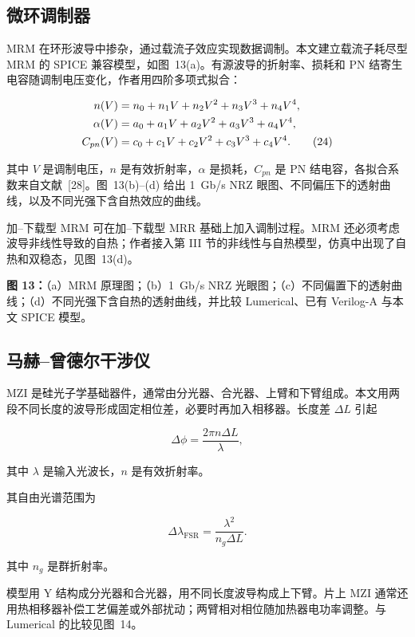 \documentclass[11pt,a4paper]{ctexart}
\begin{document}
\subsection{微环调制器}

MRM 在环形波导中掺杂，通过载流子效应实现数据调制。本文建立载流子耗尽型 MRM 的 SPICE 兼容模型，如图~13(a)。有源波导的折射率、损耗和 PN 结寄生电容随调制电压变化，作者用四阶多项式拟合：

\begin{align}
n(V)&=n_0+n_1V+n_2V^2+n_3V^3+n_4V^4,\notag\\
\alpha(V)&=a_0+a_1V+a_2V^2+a_3V^3+a_4V^4,\notag\\
C_{pn}(V)&=c_0+c_1V+c_2V^2+c_3V^3+c_4V^4.
\tag{24}
\end{align}

其中 $V$ 是调制电压，$n$ 是有效折射率，$\alpha$ 是损耗，$C_{pn}$ 是 PN 结电容，各拟合系数来自文献~[28]。图~13(b)--(d) 给出 1~Gb/s NRZ 眼图、不同偏压下的透射曲线，以及不同光强下含自热效应的曲线。

加--下载型 MRM 可在加--下载型 MRR 基础上加入调制过程。MRM 还必须考虑波导非线性导致的自热；作者接入第 III 节的非线性与自热模型，仿真中出现了自热和双稳态，见图~13(d)。

\noindent\textbf{图 13：}（a）MRM 原理图；（b）1~Gb/s NRZ 光眼图；（c）不同偏置下的透射曲线；（d）不同光强下含自热的透射曲线，并比较 Lumerical、已有 Verilog-A 与本文 SPICE 模型。

\subsection{马赫--曾德尔干涉仪}

MZI 是硅光子学基础器件，通常由分光器、合光器、上臂和下臂组成。本文用两段不同长度的波导形成固定相位差，必要时再加入相移器。长度差 $\Delta L$ 引起

\begin{equation}
\Delta\phi=\frac{2\pi n\Delta L}{\lambda},
\tag{25}
\end{equation}

其中 $\lambda$ 是输入光波长，$n$ 是有效折射率。

其自由光谱范围为

\begin{equation}
\Delta\lambda_{\mathrm{FSR}}=\frac{\lambda^2}{n_g\Delta L}.
\tag{26}
\end{equation}

其中 $n_g$ 是群折射率。

模型用 Y 结构成分光器和合光器，用不同长度波导构成上下臂。片上 MZI 通常还用热相移器补偿工艺偏差或外部扰动；两臂相对相位随加热器电功率调整。与 Lumerical 的比较见图~14。
\end{document}
